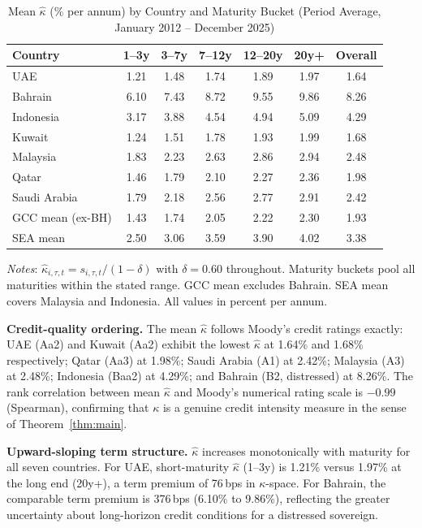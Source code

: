 \documentclass[12pt]{article}
\theoremstyle{plain}
\theoremstyle{definition}
\theoremstyle{remark}
\begin{document}
\begin{table}[htbp]
  \centering
  \caption{Mean $\hat{\kappa}$ (\% per annum) by Country and Maturity Bucket
    (Period Average, January 2012 -- December 2025)}
  \label{tab:kappa_mat}
  \small
  \begin{tabular}{lcccccc}
    \toprule
    Country & 1--3y & 3--7y & 7--12y & 12--20y & 20y+ & Overall \\
    \midrule
    UAE          & 1.21 & 1.48 & 1.74 & 1.89 & 1.97 & 1.64 \\
    Bahrain      & 6.10 & 7.43 & 8.72 & 9.55 & 9.86 & 8.26 \\
    Indonesia    & 3.17 & 3.88 & 4.54 & 4.94 & 5.09 & 4.29 \\
    Kuwait       & 1.24 & 1.51 & 1.78 & 1.93 & 1.99 & 1.68 \\
    Malaysia     & 1.83 & 2.23 & 2.63 & 2.86 & 2.94 & 2.48 \\
    Qatar        & 1.46 & 1.79 & 2.10 & 2.27 & 2.36 & 1.98 \\
    Saudi Arabia & 1.79 & 2.18 & 2.56 & 2.77 & 2.91 & 2.42 \\
    \midrule
    GCC mean (ex-BH) & 1.43 & 1.74 & 2.05 & 2.22 & 2.30 & 1.93 \\
    SEA mean         & 2.50 & 3.06 & 3.59 & 3.90 & 4.02 & 3.38 \\
    \bottomrule
  \end{tabular}
  \begin{minipage}{\textwidth}
    \smallskip
    \footnotesize
    \textit{Notes}: $\hat{\kappa}_{i,\tau,t} = s_{i,\tau,t}/(1-\delta)$ with
    $\delta = 0.60$ throughout. Maturity buckets pool all maturities within the
    stated range. GCC mean excludes Bahrain. SEA mean covers Malaysia and
    Indonesia. All values in percent per annum.
  \end{minipage}
\end{table}

\textbf{Credit-quality ordering.} The mean $\hat{\kappa}$ follows Moody's
credit ratings exactly: UAE (Aa2) and Kuwait (Aa2) exhibit the lowest
$\hat{\kappa}$ at 1.64\% and 1.68\% respectively; Qatar (Aa3) at 1.98\%;
Saudi Arabia (A1) at 2.42\%; Malaysia (A3) at 2.48\%; Indonesia (Baa2) at
4.29\%; and Bahrain (B2, distressed) at 8.26\%. The rank correlation between
mean $\hat{\kappa}$ and Moody's numerical rating scale is $-0.99$ (Spearman),
confirming that $\kappa$ is a genuine credit intensity measure in the sense of
Theorem~\ref{thm:main}.

\textbf{Upward-sloping term structure.} $\hat{\kappa}$ increases monotonically
with maturity for all seven countries. For UAE, short-maturity $\hat{\kappa}$
(1--3y) is 1.21\% versus 1.97\% at the long end (20y+), a term premium of
76\,bps in $\kappa$-space. For Bahrain, the comparable term premium is
376\,bps (6.10\% to 9.86\%), reflecting the greater uncertainty about
long-horizon credit conditions for a distressed sovereign.
\end{document}
